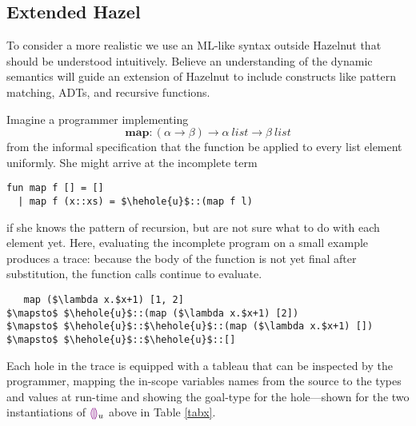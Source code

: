 \subsection{Extended Hazel}
To consider a more realistic we use an ML-like syntax outside Hazelnut that
should be understood intuitively. Believe an understanding of the dynamic
semantics will guide an extension of Hazelnut to include constructs like
pattern matching, ADTs, and recursive functions.

Imagine a programmer implementing $$\mathbf{map} : (\alpha \to \beta) \to
\alpha ~\mathit{list} \to \beta ~\mathit{list}$$ from the informal
specification that the function be applied to every list element uniformly.
She might arrive at the incomplete term
\begin{lstlisting}
fun map f [] = []
  | map f (x::xs) = $\hehole{u}$::(map f l)
\end{lstlisting}
if she knows the pattern of recursion, but are not sure what to do with
each element yet. Here, evaluating the incomplete program on a small
example produces a trace: because the body of the function is not yet final
after substitution, the function calls continue to evaluate.
\begin{lstlisting}
   map ($\lambda x.$x+1) [1, 2]
$\mapsto$ $\hehole{u}$::(map ($\lambda x.$x+1) [2])
$\mapsto$ $\hehole{u}$::$\hehole{u}$::(map ($\lambda x.$x+1) [])
$\mapsto$ $\hehole{u}$::$\hehole{u}$::[]
\end{lstlisting}
Each hole in the trace is equipped with a tableau that can be inspected by
the programmer, mapping the in-scope variables names from the source to the
types and values at run-time and showing the goal-type for the hole---shown
for the two instantiations of $\textcolor{violet}{\llparenthesis}\textcolor{violet}{\rrparenthesis}_{u}$ above in Table \ref{tabx}.

